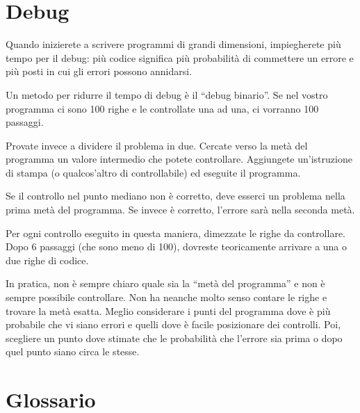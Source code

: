 \documentclass[10pt]{book}
\begin{document}
\section{Debug}
\label{bisectbug}

Quando inizierete a scrivere programmi di grandi dimensioni, impiegherete più tempo per il debug: più codice significa più probabilità di commettere un errore e più posti in cui gli errori possono annidarsi.

Un metodo per ridurre il tempo di debug è il ``debug binario''.
Se nel vostro programma ci sono 100 righe e le controllate una ad una, ci vorranno 100 passaggi.

Provate invece a dividere il problema in due. Cercate verso la metà del programma un valore intermedio che potete controllare. Aggiungete un'istruzione di stampa (o qualcos'altro di controllabile) ed eseguite il programma.

Se il controllo nel punto mediano non è corretto, deve esserci un problema nella prima metà del programma. Se invece è corretto, l'errore sarà nella seconda metà.

Per ogni controllo eseguito in questa maniera, dimezzate le righe da controllare. Dopo 6 passaggi (che sono meno di 100), dovreste teoricamente arrivare a una o due righe di codice.

In pratica, non è sempre chiaro quale sia la ``metà del programma'' e non è sempre possibile controllare. Non ha neanche molto senso contare le righe e trovare la metà esatta. Meglio considerare i punti del programma dove è più probabile che vi siano errori e quelli dove è facile posizionare dei controlli. Poi, scegliere un punto dove stimate che le probabilità che l'errore sia prima o dopo quel punto siano circa le stesse.


\section{Glossario}
\end{document}
